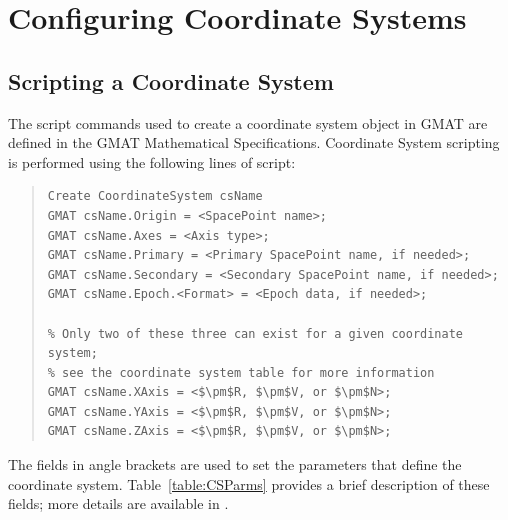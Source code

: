 \section{\label{sec:CSScriptConfiguration}Configuring Coordinate Systems}

\subsection{Scripting a Coordinate System}

The script commands used to create a coordinate system object in GMAT are defined in the GMAT
Mathematical Specifications\cite{mathSpec}.  Coordinate System scripting is performed using the
following lines of script:

\begin{quotation}
\begin{verbatim}
Create CoordinateSystem csName
GMAT csName.Origin = <SpacePoint name>;
GMAT csName.Axes = <Axis type>;
GMAT csName.Primary = <Primary SpacePoint name, if needed>;
GMAT csName.Secondary = <Secondary SpacePoint name, if needed>;
GMAT csName.Epoch.<Format> = <Epoch data, if needed>;

% Only two of these three can exist for a given coordinate system;
% see the coordinate system table for more information
GMAT csName.XAxis = <$\pm$R, $\pm$V, or $\pm$N>;
GMAT csName.YAxis = <$\pm$R, $\pm$V, or $\pm$N>;
GMAT csName.ZAxis = <$\pm$R, $\pm$V, or $\pm$N>;
\end{verbatim}
\end{quotation}

The fields in angle brackets are used to set the parameters that define the coordinate system.
Table~\ref{table:CSParms} provides a brief description of these fields; more details are available
in \cite{mathSpec}.

